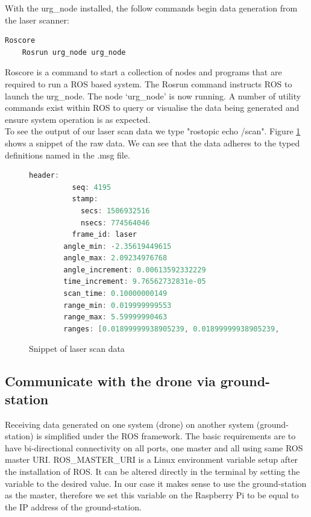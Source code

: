\documentclass[capstone_report.tex]{subfiles}
\begin{document}
With the urg\_node installed, the follow commands begin data generation from the laser scanner:

\begin{lstlisting}[language=bash]
    Roscore
    Rosrun urg_node urg_node
\end{lstlisting}

Roscore is a command to start a collection of nodes and programs that are required to run a ROS based system. The Rosrun command instructs ROS to launch the urg\_node. The node ‘urg\_node’ is now running.  A number of utility commands exist within ROS to query or visualise the data being generated and ensure system operation is as expected.\\

To see the output of our laser scan data we type "rostopic echo /scan".  Figure \ref{fig:laser_snippet} shows a snippet of the raw data.  We can see that the data adheres to the typed definitions named in the .msg file.

\begin{figure}[H]
    \centering
\begin{lstlisting}[language=c++]
        header: 
          seq: 4195
          stamp: 
            secs: 1506932516
            nsecs: 774564046
          frame_id: laser
        angle_min: -2.35619449615
        angle_max: 2.09234976768
        angle_increment: 0.00613592332229
        time_increment: 9.76562732831e-05
        scan_time: 0.10000000149
        range_min: 0.019999999553
        range_max: 5.59999990463
        ranges: [0.01899999938905239, 0.01899999938905239, ...
    \end{lstlisting}
    \caption{Snippet of laser scan data}
    \label{fig:laser_snippet}
\end{figure}

\subsection{Communicate with the drone via ground-station}
Receiving data generated on one system (drone) on another system (ground-station) is simplified under the ROS framework. The basic requirements are to have bi-directional connectivity on all ports, one master and all using same ROS master URI. ROS\_MASTER\_URI is a Linux environment variable setup after the installation of ROS.  It can be altered directly in the terminal by setting the variable to the desired value.  In our case it makes sense to use the ground-station as the master, therefore we set this variable on the Raspberry Pi to be equal to the IP address of the ground-station.
\end{document}
